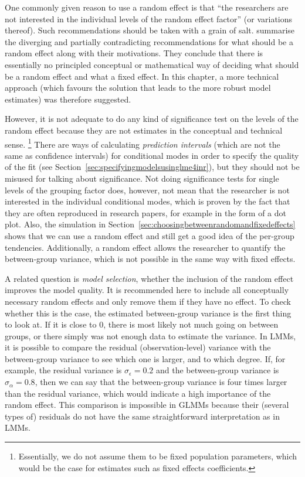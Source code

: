 One commonly given reason to use a random effect is that ``the researchers are not interested in the individual levels of the random effect factor'' (or variations thereof).
Such recommendations should be taken with a grain of salt.
\citet[245--247]{GelmanHill2006} summarise the diverging and partially contradicting recommendations for what should be a random effect along with their motivations.
They conclude that there is essentially no principled conceptual or mathematical way of deciding what should be a random effect and what a fixed effect.
In this chapter, a more technical approach (which favours the solution that leads to the more robust model estimates) was therefore suggested.

However, it is not adequate to do any kind of significance test on the levels of the random effect because they are not estimates in the conceptual and technical sense.%
\footnote{Essentially, we do not assume them to be fixed population parameters, which would be the case for estimates such as fixed effects coefficients.}
There are ways of calculating \textit{prediction intervals} (which are not the same as confidence intervals) for conditional modes in order to specify the quality of the fit (see Section~\ref{sec:specifyingmodelsusinglme4inr}), but they should not be misused for talking about significance.
Not doing significance tests for single levels of the grouping factor does, however, not mean that the researcher is not interested in the individual conditional modes, which is proven by the fact that they are often reproduced in research papers, for example in the form of a dot plot.
Also, the simulation in Section~\ref{sec:choosingbetweenrandomandfixedeffects} shows that we can use a random effect and still get a good idea of the per-group tendencies.
Additionally, a random effect allows the researcher to quantify the between-group variance, which is not possible in the same way with fixed effects.

A related question is \textit{model selection}, \ie whether the inclusion of the random effect improves the model quality.
It is recommended here to include all conceptually necessary random effects and only remove them if they have no effect.
To check whether this is the case, the estimated between-group variance is the first thing to look at.
If it is close to $0$, there is most likely not much going on between groups, or there simply was not enough data to estimate the variance.
In LMMs, it is possible to compare the residual (observation-level) variance with the between-group variance to see which one is larger, and to which degree.
If, for example, the residual variance is $\sigma_{\epsilon}=0.2$ and the between-group variance is $\sigma_{\alpha}=0.8$, then we can say that the between-group variance is four times larger than the residual variance, which would indicate a high importance of the random effect.
This comparison is impossible in GLMMs because their (several types of) residuals do not have the same straightforward interpretation as in LMMs.


